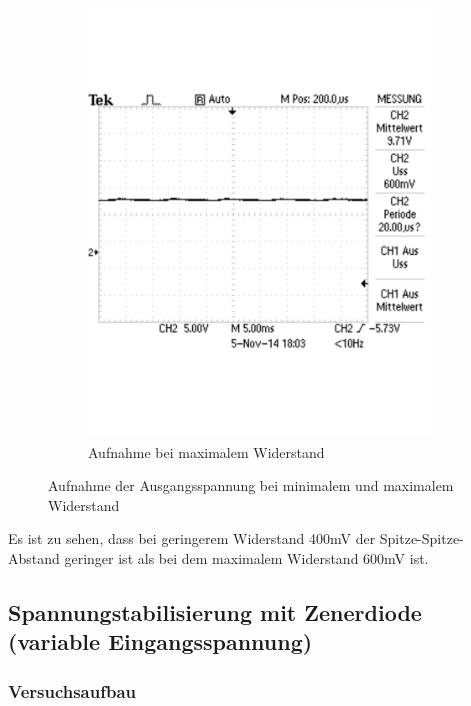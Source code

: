 \documentclass[12pt,a4paper]{article}
\begin{document}
\begin{figure}[H]
\begin{subfigure}[b]{0.48\textwidth}
                \includegraphics[width=\textwidth , scale = 0.4]{3_1_2.pdf}
                \caption[Aufnahme bei maximalem Widerstand]{Aufnahme bei maximalem Widerstand}
  				\label{fig:3_1_2}
        \end{subfigure}
        \caption{Aufnahme der Ausgangsspannung bei minimalem und maximalem Widerstand}
        \label{fig:3_1}
\end{figure}

Es ist zu sehen, dass bei geringerem Widerstand 400mV der Spitze-Spitze-Abstand geringer ist als bei dem maximalem Widerstand 600mV ist.

\subsection{Spannungstabilisierung mit Zenerdiode (variable Eingangsspannung)}
\subsubsection{Versuchsaufbau}
\end{document}
